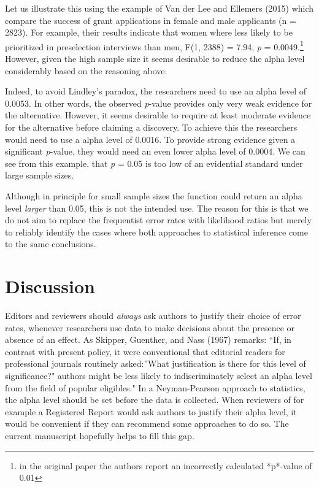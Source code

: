 \documentclass[
  english,
  ,jou,floatsintext]{apa6}
\begin{document}
Let us illustrate this using the example of Van der Lee and Ellemers (2015) which compare the success of grant applications in female and male applicants (n = 2823). For example, their results indicate that women where less likely to be prioritized in preselection interviews than men, F(1, 2388) = 7.94, \emph{p} = 0.0049.\footnote{in the original paper the authors report an incorrectly calculated *p*-value of 0.01} However, given the high sample size it seems desirable to reduce the alpha level considerably based on the reasoning above.

Indeed, to avoid Lindley's paradox, the researchers need to use an alpha level of 0.0053. In other words, the observed \emph{p}-value provides only very weak evidence for the alternative. However, it seems desirable to require at least moderate evidence for the alternative before claiming a discovery. To achieve this the researchers would need to use a alpha level of 0.0016. To provide strong evidence given a significant \emph{p}-value, they would need an even lower alpha level of 0.0004. We can see from this example, that \emph{p} = 0.05 is too low of an evidential standard under large sample sizes.

Although in principle for small sample sizes the function could return an alpha level \emph{larger} than 0.05, this is not the intended use. The reason for this is that we do not aim to replace the frequentist error rates with likelihood ratios but merely to reliably identify the cases where both approaches to statistical inference come to the same conclusions.

\hypertarget{discussion}{%
\section{Discussion}\label{discussion}}

Editors and reviewers should \emph{always} ask authors to justify their choice of error rates, whenever researchers use data to make decisions about the presence or absence of an effect. As Skipper, Guenther, and Nass (1967) remarks: ``If, in contrast with present policy, it were conventional that editorial readers for professional journals routinely asked:''What justification is there for this level of significance?" authors might be less likely to indiscriminately select an alpha level from the field of popular eligibles." In a Neyman-Pearson approach to statistics, the alpha level should be set before the data is collected. When reviewers of for example a Registered Report would ask authors to justify their alpha level, it would be convenient if they can recommend some approaches to do so. The current manuscript hopefully helps to fill this gap.
\end{document}
